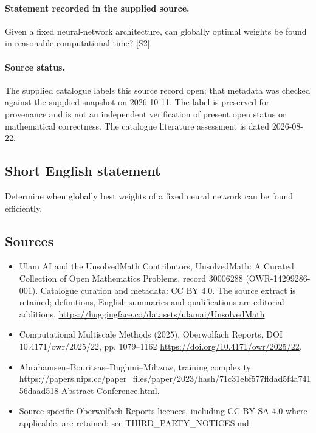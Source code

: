 \documentclass[11pt]{article}
\begin{document}
\paragraph{Statement recorded in the supplied source.}
Given a fixed neural-network architecture, can globally optimal weights be found in reasonable computational time? \href{https://doi.org/10.4171/owr/2025/22}{[S2]}
\paragraph{Source status.}
The supplied catalogue labels this source record open; that metadata was checked against the supplied snapshot on 2026-10-11. The label is preserved for provenance and is not an independent verification of present open status or mathematical correctness. The catalogue literature assessment is dated 2026-08-22.
\subsection{Short English statement}
Determine when globally best weights of a fixed neural network can be found efficiently.
\subsection{Sources}
\begin{itemize}
\item[S1] Ulam AI and the UnsolvedMath Contributors, UnsolvedMath: A Curated Collection of Open Mathematics Problems, record 30006288 (OWR-14299286-001). Catalogue curation and metadata: CC BY 4.0. The source extract is retained; definitions, English summaries and qualifications are editorial additions.
\url{https://huggingface.co/datasets/ulamai/UnsolvedMath}.
\item[S2] Computational Multiscale Methods (2025), Oberwolfach Reports, DOI 10.4171/owr/2025/22, pp. 1079--1162
\url{https://doi.org/10.4171/owr/2025/22}.
\item[S3] Abrahamsen--Bouritsas--Dughmi--Miltzow, training complexity
\url{https://papers.nips.cc/paper_files/paper/2023/hash/71c31ebf577ffdad5f4a74156daad518-Abstract-Conference.html}.
\item Source-specific Oberwolfach Reports licences, including CC BY-SA 4.0 where applicable, are retained; see THIRD\_PARTY\_NOTICES.md.
\end{itemize}
\end{document}
